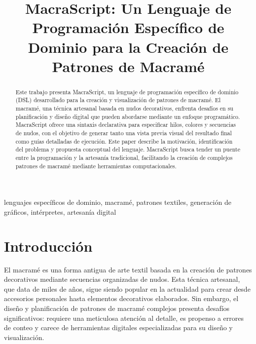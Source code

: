 \documentclass[conference]{IEEEtran}
\begin{document}
\title{MacraScript: Un Lenguaje de Programación Específico de Dominio para la Creación de Patrones de Macramé}

\author{
}

\maketitle

\begin{abstract}
Este trabajo presenta MacraScript, un lenguaje de programación específico de dominio (DSL) desarrollado para la creación y visualización de patrones de macramé. El macramé, una técnica artesanal basada en nudos decorativos, enfrenta desafíos en su planificación y diseño digital que pueden abordarse mediante un enfoque programático. MacraScript ofrece una sintaxis declarativa para especificar hilos, colores y secuencias de nudos, con el objetivo de generar tanto una vista previa visual del resultado final como guías detalladas de ejecución. Este paper describe la motivación, identificación del problema y propuesta conceptual del lenguaje. MacraScript busca tender un puente entre la programación y la artesanía tradicional, facilitando la creación de complejos patrones de macramé mediante herramientas computacionales.
\end{abstract}

\begin{IEEEkeywords}
lenguajes específicos de dominio, macramé, patrones textiles, generación de gráficos, intérpretes, artesanía digital
\end{IEEEkeywords}

\section{Introducción}
El macramé es una forma antigua de arte textil basada en la creación de patrones decorativos mediante secuencias organizadas de nudos. Esta técnica artesanal, que data de miles de años, sigue siendo popular en la actualidad para crear desde accesorios personales hasta elementos decorativos elaborados. Sin embargo, el diseño y planificación de patrones de macramé complejos presenta desafíos significativos: requiere una meticulosa atención al detalle, es propenso a errores de conteo y carece de herramientas digitales especializadas para su diseño y visualización.
\end{document}
